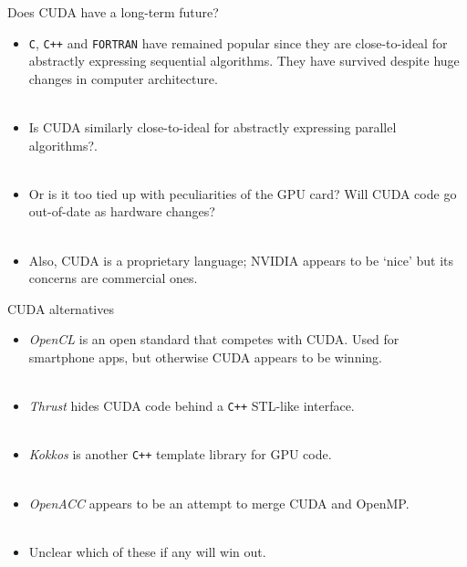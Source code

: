 \documentclass[usenames,dvipsnames]{beamer}
\begin{document}
\begin{frame}{Does CUDA have a long-term future?}
  \begin{block}{}
    \begin{itemize}
      \item{\texttt{C}, \texttt{C++} and \texttt{FORTRAN} have remained popular since they are close-to-ideal for abstractly expressing sequential algorithms. They have survived despite huge changes in computer architecture.}\\~\
      \item{Is CUDA similarly close-to-ideal for abstractly expressing parallel algorithms?.}\\~\
      \item{Or is it too tied up with peculiarities of the GPU card? Will CUDA code go out-of-date as hardware changes?}\\~\
      \item{Also, CUDA is a proprietary language; NVIDIA appears to be `nice' but its concerns are commercial ones.}
    \end{itemize}
  \end{block}
\end{frame}

\begin{frame}{CUDA alternatives}
  \begin{block}{}
    \begin{itemize}
      \item{\textit{OpenCL} is an open standard that competes with CUDA. Used for smartphone apps, but otherwise CUDA appears to be winning.}\\~\
      \item{\textit{Thrust} hides CUDA code behind a \texttt{C++} STL-like interface.}\\~\
      \item{\textit{Kokkos} is another \texttt{C++} template library for GPU code.}\\~\
      \item{\textit{OpenACC} appears to be an attempt to merge CUDA and OpenMP.}\\~\
      \item{Unclear which of these if any will win out.}
    \end{itemize}
  \end{block}
\end{frame}
\end{document}
